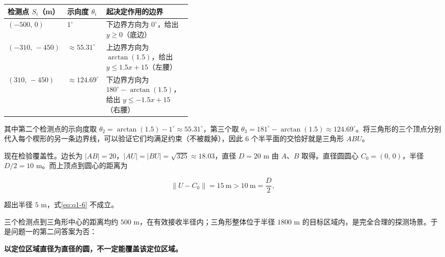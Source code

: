 \begin{center}
\label{tab:q1-counterexample}
\end{center}

\begin{center}
\renewcommand{\arraystretch}{1.3}
\begin{tabularx}{0.98\linewidth}{>{\centering\arraybackslash}p{0.22\linewidth}>{\centering\arraybackslash}p{0.20\linewidth}>{\raggedright\arraybackslash}X}
\toprule
\textbf{检测点 $S_i$（m）} & \textbf{示向度 $\theta_i$} & \textbf{起决定作用的边界} \\
\midrule
$(-500,\,0)$ & $1^\circ$ & 下边界方向为 $0^\circ$，给出 $y\ge0$（底边） \\
$(-310,\,-450)$ & $\approx55.31^\circ$ & 上边界方向为 $\arctan(1.5)$，给出 $y\le1.5x+15$（左腰） \\
$(310,\,-450)$ & $\approx124.69^\circ$ & 下边界方向为 $180^\circ-\arctan(1.5)$，给出 $y\le-1.5x+15$（右腰） \\
\bottomrule
\end{tabularx}
\end{center}

其中第二个检测点的示向度取 $\theta_2=\arctan(1.5)-1^\circ\approx55.31^\circ$，第三个取 $\theta_3=181^\circ-\arctan(1.5)\approx124.69^\circ$。将三角形的三个顶点分别代入每个楔形的另一条边界线，可以验证它们均满足约束（不被裁掉），因此 $6$ 个半平面的交恰好就是三角形 $ABU$。

现在检验覆盖性。边长为 $|AB|=20$，$|AU|=|BU|=\sqrt{325}\approx18.03$，直径 $D=20$ m 由 $A$、$B$ 取得。直径圆圆心 $C_0=(0,\,0)$，半径 $D/2=10$ m。而上顶点到圆心的距离为

\[
\|U-C_0\|=15\ \text{m}>10\ \text{m}=\frac D2,
\]

超出半径 $5$ m，式\eqref{eq:q1-6} 不成立。

\begin{center}
\begin{minipage}{\linewidth}
\centering
\QOneCaseFigure
{}
\label{fig:q1-counterexample}
\end{minipage}
\end{center}


三个检测点到三角形中心的距离均约 $500$ m，在有效接收半径内；三角形整体位于半径 $1800$ m 的目标区域内，是完全合理的探测场景。于是问题一的第二问答案为否：

\textbf{以定位区域直径为直径的圆，不一定能覆盖该定位区域。}
